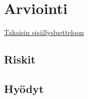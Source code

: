 \section{Arviointi}
\label{sec:arviointi}
\hyperlink{index}{Takaisin sisällysluetteloon}
\subsection{Riskit}
\subsection{Hyödyt}